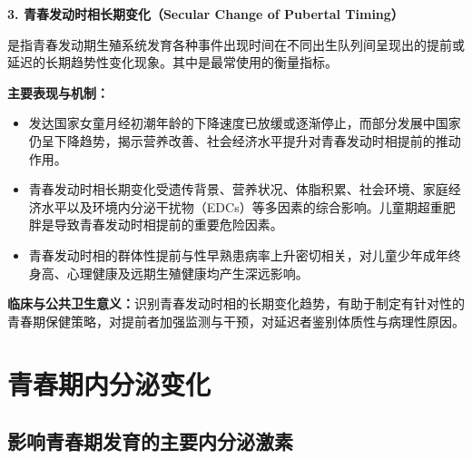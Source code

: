 \begin{defbox}
\textbf{3. 青春发动时相长期变化（Secular Change of Pubertal Timing）}

是指青春发动期生殖系统发育各种事件出现时间在不同出生队列间呈现出的提前或延迟的长期趋势性变化现象。其中是最常使用的衡量指标。

\textbf{主要表现与机制：}
\begin{itemize}[leftmargin=*]
    \item 发达国家女童月经初潮年龄的下降速度已放缓或逐渐停止，而部分发展中国家仍呈下降趋势，揭示营养改善、社会经济水平提升对青春发动时相提前的推动作用。
    \item 青春发动时相长期变化受遗传背景、营养状况、体脂积累、社会环境、家庭经济水平以及环境内分泌干扰物（EDCs）等多因素的综合影响。儿童期超重肥胖是导致青春发动时相提前的重要危险因素。
    \item 青春发动时相的群体性提前与性早熟患病率上升密切相关，对儿童少年成年终身高、心理健康及远期生殖健康均产生深远影响。
\end{itemize}

\textbf{临床与公共卫生意义：}识别青春发动时相的长期变化趋势，有助于制定有针对性的青春期保健策略，对提前者加强监测与干预，对延迟者鉴别体质性与病理性原因。
\end{defbox}

\section{青春期内分泌变化}

\subsection{影响青春期发育的主要内分泌激素}

